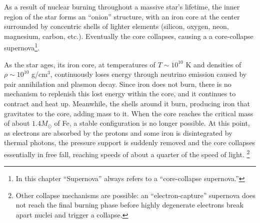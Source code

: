 

As a result of nuclear burning throughout a massive star's lifetime, the %
inner region of the star forms an ``onion'' structure, with an iron core at the center surrounded by concentric shells of lighter elements (silicon, oxygen, neon, magnesium, carbon, etc.). Eventually the core collapses, causing a 
a core-collapse supernova\footnote{In this chapter ``Supernova'' always refers to a ``core-collapse supernova.''}.
 
As the star ages, its iron core, at temperatures of $T\sim 10^{10}$ K and densities of $\rho \sim 10^{10}$ g/cm$^{3}$, continuously loses energy through neutrino emission caused by pair annihilation and plasmon decay. Since iron does not burn, there is no mechanism to replenish this lost energy within the core, and it continues to contract and heat up. Meanwhile, the shells around it burn, producing iron that gravitates to the core, adding mass to it.  When the core reaches the critical mass of about $1.4 M_{\odot}$ of Fe, a stable configuration is no longer possible. At this point, as electrons are absorbed by the protons and some iron is disintegrated by thermal photons, the pressure support is suddenly removed and the core collapses essentially in free fall, reaching speeds of about a quarter of the speed of light. 
\footnote{Other collapse mechanisms are possible: an ``electron-capture'' supernova does not reach the final burning phase before highly degenerate electrons break apart nuclei and trigger a collapse.}


